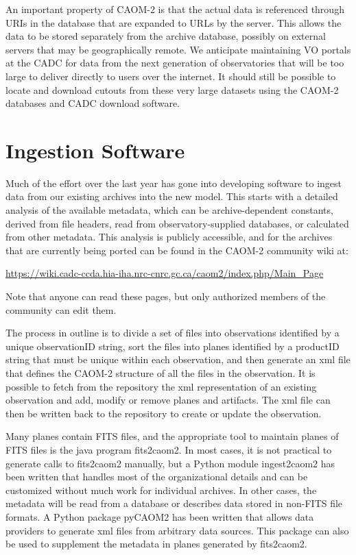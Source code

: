 \documentclass[11pt,twoside]{article}
\begin{document}
An important property of CAOM-2 is that the actual data is referenced through URIs in the database that are expanded to URLs by the server.  This allows the data to be stored separately from the archive database, possibly on external servers that may be geographically remote.  We anticipate maintaining VO portals at the CADC for data from the next generation of observatories that will be too large to deliver directly to users over the internet.  It should still be possible to locate and download cutouts from these very large datasets using the CAOM-2 databases and CADC download software.

\section{Ingestion Software}
Much of the effort over the last year has gone into developing software to ingest data from our existing archives into the new model.  This starts with a detailed analysis of the available metadata, which can be archive-dependent constants, derived from file headers, read from observatory-supplied databases, or calculated from other metadata.  This analysis is publicly accessible, and for the archives that are currently being ported can be found in the CAOM-2 community wiki at: 
\begin{center}
{\small \url{https://wiki.cadc-ccda.hia-iha.nrc-cnrc.gc.ca/caom2/index.php/Main_Page}}  
\end{center}
Note that anyone can read these pages, but only authorized members of the community can edit them.  

The process in outline is to divide a set of files into observations identified by a unique observationID string, sort the files into planes identified by a productID string that must be unique within each observation, and then generate an xml file that defines the CAOM-2 structure of all the files in the observation.  It is possible to fetch from the repository the xml representation of an existing observation and add, modify or remove planes and artifacts.  The xml file can then be written back to the repository to create or update the observation.

Many planes contain FITS files, and the appropriate tool to maintain planes of FITS files is the java program fits2caom2.  In most cases, it is not practical to generate calls to fits2caom2 manually, but a Python module ingest2caom2 has been written that handles most of the organizational details and can be customized without much work for individual archives.  In other cases, the metadata will be read from a database or describes data stored in non-FITS file formats.  A Python package pyCAOM2 has been written that allows data providers to generate xml files from arbitrary data sources.  This package can also be used to supplement the metadata in planes generated by fits2caom2.  
\end{document}
